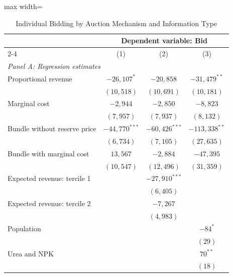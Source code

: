\documentclass[11pt]{article}
\begin{document}
\begin{table}[!htbp]
\centering
\caption{Individual Bidding by Auction Mechanism and Information Type}
\label{tab:individual_bidding}
\begin{threeparttable}

\small
\renewcommand{\arraystretch}{1.05}

\begin{adjustbox}{max width=\textwidth}
\begin{tabular}{lccc}
\toprule
& \multicolumn{3}{c}{Dependent variable: Bid} \\
\cmidrule(lr){2-4}
& (1) & (2) & (3) \\
\midrule

\multicolumn{4}{l}{\textit{Panel A: Regression estimates}} \\[2pt]

Proportional revenue
    & $-26{,}107^{*}$
    & $-20{,}858$
    & $-31{,}479^{**}$ \\
    & $(10{,}518)$
    & $(10{,}691)$
    & $(10{,}181)$ \\

Marginal cost
    & $-2{,}944$
    & $-2{,}850$
    & $-8{,}823$ \\
    & $(7{,}957)$
    & $(7{,}937)$
    & $(8{,}132)$ \\

Bundle without reserve price
    & $-44{,}770^{***}$
    & $-60{,}426^{***}$
    & $-113{,}338^{**}$ \\
    & $(6{,}734)$
    & $(7{,}105)$
    & $(27{,}635)$ \\

Bundle with marginal cost
    & $13{,}567$
    & $-2{,}884$
    & $-47{,}395$ \\
    & $(10{,}547)$
    & $(12{,}496)$
    & $(31{,}359)$ \\[2pt]

Expected revenue: tercile 1
    & & $-27{,}910^{***}$ & \\
    & & $(6{,}405)$ & \\

Expected revenue: tercile 2
    & & $-7{,}267$ & \\
    & & $(4{,}983)$ & \\[2pt]

Population
    & & & $-84^{*}$ \\
    & & & $(29)$ \\

Urea and NPK
    & & & $70^{**}$ \\
    & & & $(18)$ \\


\end{tabular}
\end{adjustbox}
\end{threeparttable}
\end{table}
\end{document}
